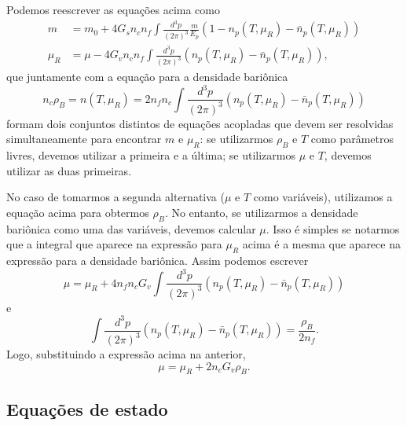 Podemos reescrever as equações acima como
\begin{align}
	m &= m_0 + 4 G_s n_c n_f \int\frac{d^3p}{(2\pi)^3} \frac{m}{E_p} (1 - n_p(T, \mu_R) - \bar{n}_p(T, \mu_R)) \label{gap} \\
	\mu_R &= \mu - 4 G_v n_c n_f \int\frac{d^3p}{(2\pi)^3} (n_p(T, \mu_R) - \bar{n}_p(T, \mu_R)) \label{gap_mu_r},
\end{align}
%
que juntamente com a equação para a densidade bariônica
\begin{equation}\label{gap_rho}
	n_c \rho_B = n(T, \mu_R) = 2 n_f n_c\int\frac{d^3p}{(2\pi)^3}(n_p(T, \mu_R) - \bar{n}_p(T, \mu_R)) 
\end{equation}
%
formam dois conjuntos distintos de equações acopladas que devem ser resolvidas simultaneamente para encontrar $m$ e $\mu_R$: se utilizarmos $\rho_B$ e $T$ como parâmetros livres, devemos utilizar a primeira e a última; se utilizarmos $\mu$ e $T$, devemos utilizar as duas primeiras. 

No caso de tomarmos a segunda alternativa ($\mu$ e $T$ como variáveis), utilizamos a equação acima para obtermos $\rho_B$. No entanto, se utilizarmos a densidade bariônica como uma das variáveis, devemos calcular $\mu$. Isso é simples se notarmos que a integral que aparece na expressão para $\mu_R$ acima é a mesma que aparece na expressão para a densidade bariônica. Assim podemos escrever
\begin{equation}
	\mu = \mu_R + 4 n_f n_c G_v \int \frac{d^3p}{(2\pi)^3} (n_p(T, \mu_R) - \bar{n}_p(T, \mu_R))
\end{equation}
%
e
\begin{equation}
	\int\frac{d^3p}{(2\pi)^3} (n_p(T, \mu_R) - \bar{n}_p(T, \mu_R)) = \frac{\rho_B}{2 n_f}.
\end{equation}
%
Logo, substituindo a expressão acima na anterior,
\begin{equation}\label{Eq:Pot_quim_a_partir_de_mu_r_rho_bar}
	\mu = \mu_R + 2 n_c G_v \rho_B.
\end{equation}

\subsection{Equações de estado}

